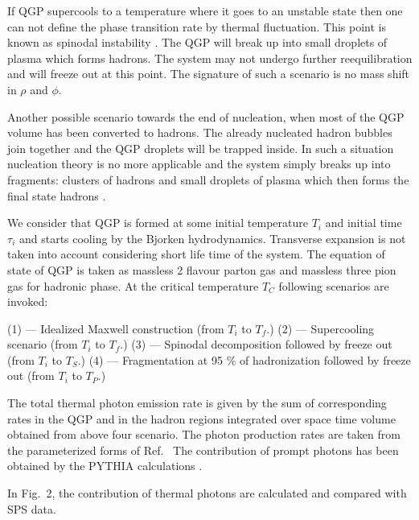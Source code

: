 If QGP supercools to a temperature where it goes to an unstable state 
then one can not define the phase transition rate by thermal fluctuation. 
This point is known as spinodal instability \cite{SPINO}. The QGP will
break up into small droplets of plasma which forms hadrons. 
The system may not undergo further reequilibration and will freeze
out at this point. The signature of such a scenario is no mass shift in 
$\rho$ and $\phi$.

  Another possible scenario towards the end of nucleation, when most of 
the QGP volume has been converted to hadrons. The already nucleated hadron 
bubbles join together and the QGP droplets will be trapped inside. 
In such a situation nucleation theory is no more applicable and the 
system simply breaks up into fragments: 
clusters of hadrons and small droplets of plasma which then forms the 
final state hadrons \cite{ZABPRC}. 

  We consider that QGP is formed at some initial temperature $T_i$ and
initial time $\tau_i$ and starts cooling by the Bjorken hydrodynamics.
Transverse expansion is not taken into account considering short 
life time of the system. The equation of state of QGP is taken as 
massless 2 flavour parton gas and massless three pion gas for hadronic phase.
At the critical temperature $T_C$ following scenarios are invoked:


(1) --- Idealized Maxwell construction (from $T_i$ to $T_f$.)
(2) --- Supercooling scenario (from $T_i$ to $T_f$.)
(3) --- Spinodal decomposition followed by freeze out
             (from $T_i$ to $T_S$.)
(4) --- Fragmentation at 95 \% of hadronization followed by freeze out
               (from $T_i$ to $T_P$.)

  The total thermal photon emission rate is given by the sum of 
corresponding rates in the QGP and in the hadron regions integrated 
over space time volume obtained from above four scenario. The photon 
production rates are taken from the parameterized forms of Ref.~\cite{THOMA}
The contribution of prompt photons has been obtained by the PYTHIA
calculations \cite{GALL}.

   In Fig.~2, the contribution of thermal photons are calculated and 
compared with SPS data.

\begin{figure}
\begin{center}
\centerline{\hbox{
}}
\end{center}
\end{figure}


